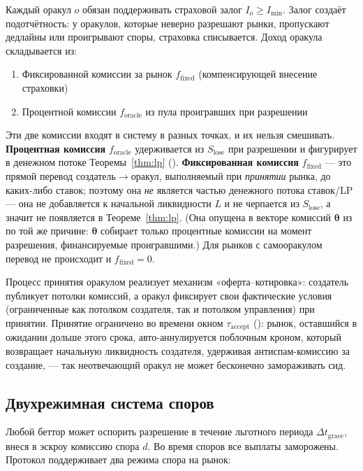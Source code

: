 \documentclass{ledger}
\theoremstyle{plain}
\theoremstyle{remark}
\begin{document}
Каждый оракул $o$ обязан поддерживать страховой залог $I_o \geq I_{\min}$. Залог
создаёт подотчётность: у оракулов, которые неверно разрешают рынки, пропускают
дедлайны или проигрывают споры, страховка списывается. Доход оракула складывается
из:

\begin{enumerate}
  \item Фиксированной комиссии за рынок $f_{\text{fixed}}$ (компенсирующей внесение
  страховки)
  \item Процентной комиссии $f_{\text{oracle}}$ из пула проигравших при разрешении
\end{enumerate}

Эти две комиссии входят в систему в разных точках, и их нельзя смешивать.
\textbf{Процентная комиссия} $f_{\text{oracle}}$ удерживается из $S_{\text{lose}}$
при разрешении и фигурирует в денежном потоке Теоремы~\ref{thm:lp}
(). \textbf{Фиксированная комиссия} $f_{\text{fixed}}$ --- это прямой
перевод создатель$\rightarrow$оракул, выполняемый при \emph{принятии} рынка, до
каких-либо ставок; поэтому она \emph{не} является частью денежного потока
ставок/LP --- она не добавляется к начальной ликвидности $L$ и не черпается из
$S_{\text{lose}}$, а значит не появляется в Теореме~\ref{thm:lp}. (Она опущена в
векторе комиссий $\boldsymbol{\theta}$ из  по той же причине:
$\boldsymbol{\theta}$ собирает только процентные комиссии на момент разрешения,
финансируемые проигравшими.) Для рынков с самооракулом перевод не происходит и
$f_{\text{fixed}} = 0$.

Процесс принятия оракулом реализует механизм «оферта--котировка»: создатель
публикует потолки комиссий, а оракул фиксирует свои фактические условия
(ограниченные как потолком создателя, так и потолком управления) при принятии.
Принятие ограничено во времени окном $\tau_{\text{accept}}$ (): рынок,
оставшийся в ожидании дольше этого срока, авто-аннулируется поблочным кроном, который
возвращает начальную ликвидность создателя, удерживая антиспам-комиссию за создание,
--- так неотвечающий оракул не может бесконечно замораживать сид.

\subsection{Двухрежимная система споров}\label{sec:disputemodes}

Любой беттор может оспорить разрешение в течение льготного периода
$\Delta t_{\text{grace}}$, внеся в эскроу комиссию спора $d$. Во время споров все
выплаты заморожены. Протокол поддерживает два режима спора на рынок:
\end{document}
